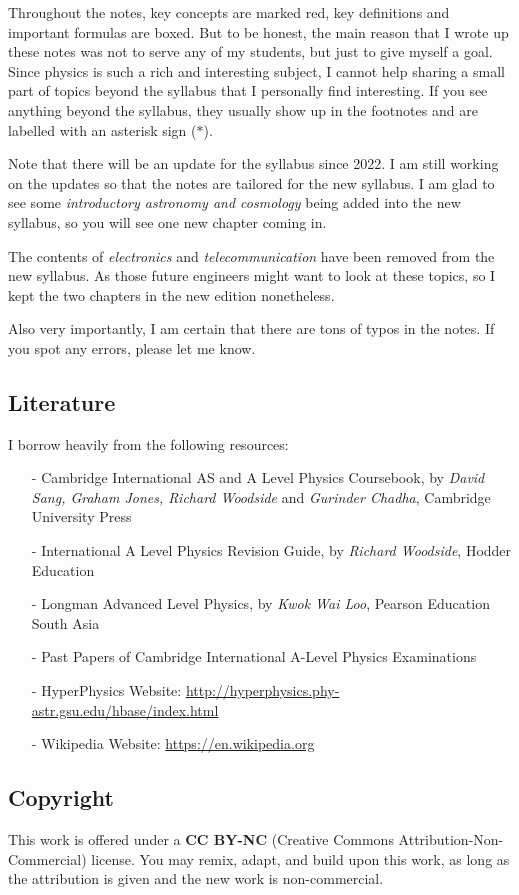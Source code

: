 Throughout the notes, key concepts are marked red, key definitions and important formulas are boxed. But to be honest, the main reason that I wrote up these notes was not to serve any of my students, but just to give myself a goal. Since physics is such a rich and interesting subject, I cannot help sharing a small part of topics beyond the syllabus that I personally find interesting. If you see anything beyond the syllabus, they usually show up in the footnotes and are labelled with an asterisk sign ($\ast$).

Note that there will be an update for the syllabus since 2022. I am still working on the updates so that the notes are tailored for the new syllabus. I am glad to see some \emph{introductory astronomy and cosmology} being added into the new syllabus, so you will see one new chapter coming in.

The contents of \emph{electronics} and \emph{telecommunication} have been removed from the new syllabus. As those future engineers might want to look at these topics, so I kept the two chapters in the new edition nonetheless.

Also very importantly, I am certain that there are tons of typos in the notes. If you spot any errors, please let me know.


\subsection*{Literature}

I borrow heavily from the following resources:

\begin{itemize}
\item[-] Cambridge International AS and A Level Physics Coursebook, by \textit{David Sang, Graham Jones, Richard Woodside} and \textit{Gurinder Chadha}, Cambridge University Press

\item[-] International A Level Physics Revision Guide, by \textit{Richard Woodside}, Hodder Education

\item[-] Longman Advanced Level Physics, by \textit{Kwok Wai Loo},	Pearson Education South Asia

\item[-] Past Papers of Cambridge International A-Level Physics Examinations

\item[-] HyperPhysics Website: \url{http://hyperphysics.phy-astr.gsu.edu/hbase/index.html}

\item[-] Wikipedia Website: \url{https://en.wikipedia.org}
\end{itemize}

\subsection*{Copyright}

This work is offered under a \textbf{CC BY-NC} (Creative Commons Attribution-Non-Commercial) license. You may remix, adapt, and build upon this work, as long as the attribution is given and the new work is non-commercial.